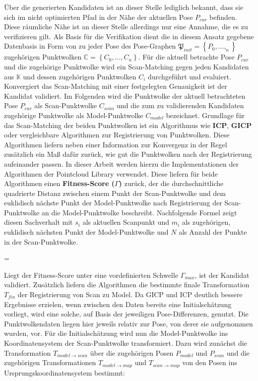 Über die generierten Kandidaten ist an dieser Stelle lediglich bekannt, dass sie sich im nicht optimierten Pfad in der Nähe der aktuellen Pose $P_{cur}$ befinden. Diese räumliche Nähe ist an dieser Stelle allerdings nur eine Annahme, die es zu verifizieren gilt. Als Basis für die Verifikation dient die in diesem Ansatz gegebene Datenbasis in Form von zu jeder Pose des Pose-Graphen $\mathfrak{P}_{init} = \left\lbrace P_0, ..., _n \right\rbrace$ zugehörigen Punktwolken $ \mathbb{C} = \left\lbrace C_0, ..., C_n \right\rbrace$. Für die aktuell betrachte Pose $P_{cur}$ und die zugehörige Punktwolke wird ein Scan-Matching gegen jeden Kandidaten aus  $\mathbb{K}$ und dessen zugehörigen Punktwolken $C_i$ durchgeführt und evaluiert. Konvergiert das Scan-Matching mit einer festgelegten Genauigkeit ist der Kandidat validiert. Im Folgenden wird die Punktwolke der aktuell betrachteten Pose $P_{cur}$ als Scan-Punktwolke $C_{scan}$ und die zum zu validierenden Kandidaten zugehörige Punktwolke als Model-Punktwolke $C_{model}$ bezeichnet. Grundlage für das Scan-Matching der beiden Punktwolken ist ein Algorithmus wie \textbf{ICP}, \textbf{GICP} oder vergleichbare Algorithmen zur Registrierung von Punktwolken. Diese Algorithmen liefern neben einer Information zur Konvergenz in der Regel zusätzlich ein Maß dafür zurück, wie gut die Punktwolken nach der Registrierung aufeinander passen. In dieser Arbeit werden hierzu die Implementationen der Algorithmen der Pointcloud Library \cite{rusu20113d} verwendet. Diese liefern für beide Algorithmen einen \textbf{Fitness-Score ($\Gamma$)} zurück, der die durchschnittliche quadrierte Distanz zwischen einem Punkt der Scan-Punktwolke und dem euklidisch nächste Punkt der Model-Punktwolke nach Registrierung der Scan-Punktwolke an die Model-Punktwolke beschreibt. Nachfolgende Formel zeigt diesen Sachverhalt mit $s_i$ als aktuellen Scanpunkt und $m_i$ als zugehörigen, euklidisch nächsten Punkt der Model-Punktwolke und $N$ als Anzahl der Punkte in der Scan-Punktwolke.

\begin{myequation}
\Gamma = 
\end{myequation}

Liegt der Fitness-Score unter eine vordefinierten Schwelle $\Gamma_{max}$, ist der Kandidat validiert.
Zusätzlich liefern die Algorithmen die bestimmte finale Transformation $T_{fin}$ der Registrierung von Scan zu Model. Da GICP und ICP deutlich bessere Ergebnisse erzielen, wenn zwischen den Daten bereits eine Initialschätzung vorliegt, wird eine solche, auf Basis der jeweiligen Pose-Differenzen, genutzt. Die Punktwolkendaten liegen hier jeweils relativ zur Pose, von derer sie aufgenommen wurden, vor. Für die Initialschätzung wird nun die Model-Punktwolke ins Koordinatensystem der Scan-Punktwolke transformiert. Dazu wird zunächst die Transformation $T_{model \rightarrow scan}$ über die zugehörigen Posen $P_{model}$ und $P_{scan}$ und die zugehörigen Transformationen $T_{model \rightarrow map}$ und $T_{scan \rightarrow map}$ von den Posen ins Ursprungskoordinatensystem bestimmt:

